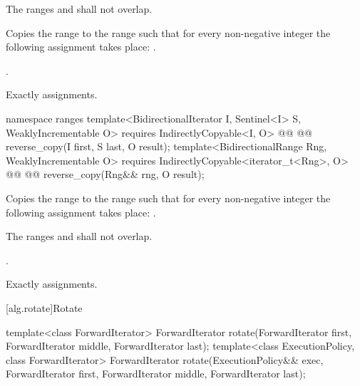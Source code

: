 \begin{itemdescr}
\pnum
\requires
The ranges
and
shall not overlap.

\pnum
\effects
Copies the range
to the range
such that
for every non-negative integer
the following assignment takes place:
.

\pnum
\returns
{}.

\pnum
\complexity
Exactly
assignments.
\end{itemdescr}

\begin{addedblock}
%
\begin{itemdecl}
namespace ranges {
  template<BidirectionalIterator I, Sentinel<I> S, WeaklyIncrementable O>
    requires IndirectlyCopyable<I, O>
    @@
    @@
      reverse_copy(I first, S last, O result);
  template<BidirectionalRange Rng, WeaklyIncrementable O>
    requires IndirectlyCopyable<iterator_t<Rng>, O>
    @@
    @@
      reverse_copy(Rng&& rng, O result);
}
\end{itemdecl}

\begin{itemdescr}
\pnum
\effects
Copies the range
to the range
such that
for every non-negative integer
the following assignment takes place:
.

\pnum
\requires
The ranges
and
shall not overlap.

\pnum
\returns
{}.

\pnum
\complexity
Exactly
assignments.
\end{itemdescr}
\end{addedblock}

[alg.rotate]{Rotate}

%
\begin{itemdecl}
template<class ForwardIterator>
  ForwardIterator
    rotate(ForwardIterator first, ForwardIterator middle, ForwardIterator last);
template<class ExecutionPolicy, class ForwardIterator>
  ForwardIterator
    rotate(ExecutionPolicy&& exec,
           ForwardIterator first, ForwardIterator middle, ForwardIterator last);
\end{itemdecl}


